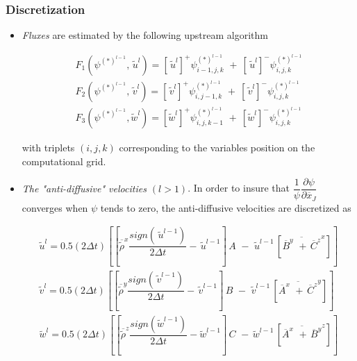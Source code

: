 \subsubsection{Discretization}

\begin{itemize}

\item {\em Fluxes } are estimated by the following upstream algorithm

\begin{eqnarray}
\label{flux1}
F_1(\psi^{(*)^{l-1}}, \,\tilde{u}^{l}) = [\,\tilde{u}^{l}]^{+}
\psi^{(*)^{l-1}}_{i-1,j,k}\,
\, + \ [\,\tilde{u}^{l}]^{-}
\psi^{(*)^{l-1}}_{i,j,k}\\
\label{flux2}
F_2(\psi^{(*)^{l-1}}, \,\tilde{v}^{l}) = [\,\tilde{v}^{l}]^{+}
\psi^{(*)^{l-1}}_{i,j-1,k}\,
\, + \ [\,\tilde{v}^{l}]^{-}
\psi^{(*)^{l-1}}_{i,j,k}\\
\label{flux3}
F_3(\psi^{(*)^{l-1}}, \tilde{w}^{l}) = [\tilde{w}^{l}]^{+}
\psi^{(*)^{l-1}}_{i,j,k-1}\,
\, + \ [\tilde{w}^{l}]^{-}
\psi^{(*)^{l-1}}_{i,j,k}
\end{eqnarray}

\noindent with triplets $(i,j,k)$ corresponding to the variables position
on the computational grid.

\item {\em The "anti-diffusive" velocities $(l>1)$}. In order to insure
that $\dfrac{1}{\psi} \dfrac{\partial \psi}{\partial \overline{x}_J}$
converges when $\psi$ tends to zero, the anti-diffusive velocities are
discretized as

\begin{eqnarray}
\tilde{u}^{l}  =  0.5(2\Delta t) \left[{
\left[ \overline{\tilde{\rho}}^{x} \dfrac{sign(\,\tilde{u}^{l-1})}{2\Delta t}
                                      - \,\tilde{u}^{l-1}  \right] \, A \,
\, - \, {\,\tilde{u}^{l-1}}\,
\left[\overline{ \overline{B}^y \,\,+ \, \overline{C}^z }^{x} \right]}\right] \\
\tilde{v}^{l}  =  0.5(2\Delta t) \left[{
\left[ \overline{\tilde{\rho}}^{y} \dfrac{sign(\,\tilde{v}^{l-1})}{2\Delta t}
                                      - \,\tilde{v}^{l-1}  \right] \, B \,
\, - \, {\,\tilde{v}^{l-1}}\,
\left[\overline{ \overline{A}^x \,\,+ \, \overline{C}^z }^{y} \right]}\right] \\
\tilde{w}^{l}  =  0.5(2\Delta t) \left[{
\left[ \overline{\tilde{\rho}}^{z} \dfrac{sign(  \tilde{w}^{l-1})}{2\Delta t}
                                      -   \tilde{w}^{l-1}  \right] \, C \,
\, - \, {  \tilde{w}^{l-1}}\,
\left[\overline{ \overline{A}^x \,\,+ \, \overline{B}^y }^{z} \right]}\right]
\end{eqnarray}



\end{itemize}
